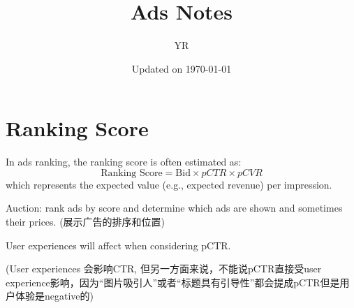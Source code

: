 

\usepackage{color}
\usepackage{wasysym}
\usepackage[yyyymmdd,hhmmss]{datetime}
\renewcommand{\dateseparator}{-}
\usepackage{ulem}




\newcommand{\Yiran}[1]{\textcolor{blue}{#1}}


\title{Ads Notes}
\author{YR}
\date{Updated on \today}



\maketitle
\section{Ranking Score}

In ads ranking, the ranking score is often estimated as:
\[
\text{Ranking Score} = \text{Bid} \times pCTR \times pCVR
\]
which represents the expected value (e.g., expected revenue) per impression.

Auction: rank ads by score and determine which ads are shown and sometimes their prices. (展示广告的排序和位置)

User experiences will affect  when considering pCTR. 

(User experiences 会影响CTR, 但另一方面来说，不能说pCTR直接受user experience影响，因为“图片吸引人”或者“标题具有引导性”都会提成pCTR但是用户体验是negative的)


